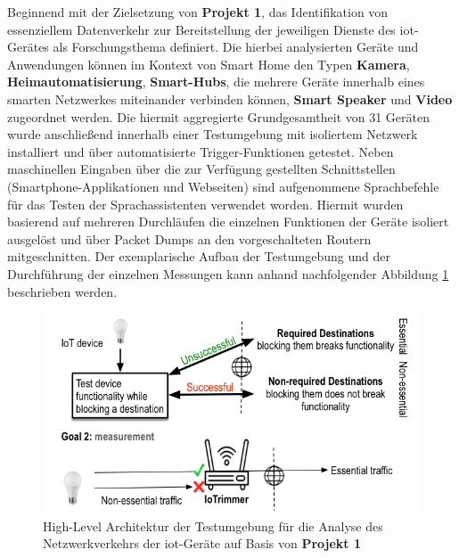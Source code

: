 \noindent Beginnend mit der Zielsetzung von \textbf{Projekt 1}, das Identifikation von essenziellem Datenverkehr zur Bereitstellung der jeweiligen Dienste des \ac{iot}-Gerätes als Forschungsthema definiert. Die hierbei analysierten Geräte und Anwendungen können im Kontext von Smart Home den Typen \textbf{Kamera}, \textbf{Heimautomatisierung}, \textbf{Smart-Hubs}, die mehrere Geräte innerhalb eines smarten Netzwerkes miteinander verbinden können, \textbf{Smart Speaker} und \textbf{Video} zugeordnet werden. 
Die hiermit aggregierte Grundgesamtheit von 31 Geräten wurde anschließend innerhalb einer Testumgebung mit isoliertem Netzwerk installiert und über automatisierte Trigger-Funktionen getestet. 
Neben maschinellen Eingaben über die zur Verfügung gestellten Schnittstellen (Smartphone-Applikationen und Webseiten) sind aufgenommene Sprachbefehle für das Testen der Sprachassistenten verwendet worden. Hiermit wurden basierend auf mehreren Durchläufen die einzelnen Funktionen der Geräte isoliert ausgelöst und über Packet Dumps an den vorgeschalteten Routern mitgeschnitten.
Der exemplarische Aufbau der Testumgebung und der Durchführung der einzelnen Messungen kann anhand nachfolgender Abbildung \ref{fig:test-setup-proj1} beschrieben werden.

\begin{figure}
    \centering
    \includegraphics[scale=0.35]{main/countermeasures/pictures/IoTrimmer_IoTrigger}
    \caption{High-Level Architektur der Testumgebung für die Analyse des Netzwerkverkehrs der \ac{iot}-Geräte auf Basis von \textbf{Projekt 1} \cite{Mandalari2021}}
    \label{fig:test-setup-proj1}
\end{figure}

